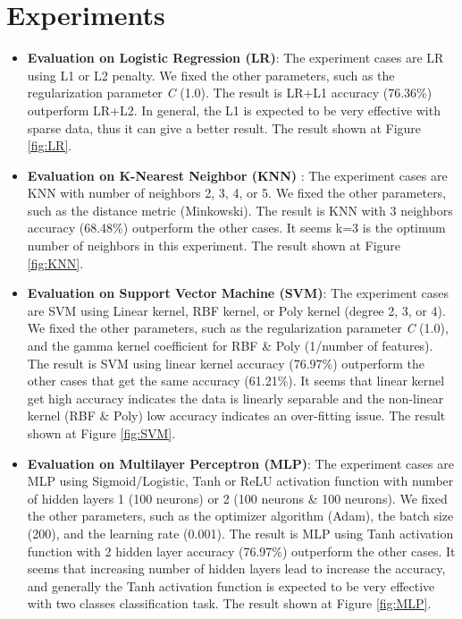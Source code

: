 \documentclass[a4paper,oneside]{article}
\begin{document}
\section{Experiments}
\begin{itemize}
\item \textbf{Evaluation on Logistic Regression (LR)}: The experiment cases are LR using L1 or L2 penalty. We fixed the other parameters, such as the regularization parameter \textit{C} (1.0). The result is LR+L1 accuracy (76.36\%) outperform LR+L2. In general, the L1 is expected to be very effective with sparse data, thus it can give a better result. The result shown at Figure \ref{fig:LR}.

\item \textbf{Evaluation on K-Nearest Neighbor (KNN)} : The experiment cases are KNN with number of neighbors 2, 3, 4, or 5. We fixed the other parameters, such as the distance metric (Minkowski). The result is KNN with 3 neighbors accuracy (68.48\%) outperform the other cases. It seems k=3 is the optimum number of neighbors in this experiment. The result shown at Figure \ref{fig:KNN}.

\item \textbf{Evaluation on Support Vector Machine (SVM)}: The experiment cases are SVM using Linear kernel, RBF kernel, or Poly kernel (degree 2, 3, or 4). We fixed the other parameters, such as the regularization parameter \textit{C} (1.0), and the gamma kernel coefficient for RBF \& Poly (1/number of features). The result is SVM using linear kernel accuracy (76.97\%) outperform the other cases that get the same accuracy (61.21\%). It seems that linear kernel get high accuracy indicates the data is linearly separable and the non-linear kernel (RBF \& Poly) low accuracy indicates an over-fitting issue. The result shown at Figure \ref{fig:SVM}.

\item \textbf{Evaluation on Multilayer Perceptron (MLP)}: The experiment cases are MLP using Sigmoid/Logistic, Tanh or ReLU activation function with number of hidden layers 1 (100 neurons) or 2 (100 neurons \& 100 neurons). We fixed the other parameters, such as the optimizer algorithm (Adam), the batch size (200), and the learning rate (0.001). The result is MLP using Tanh activation function with 2 hidden layer accuracy (76.97\%) outperform the other cases. It seems that increasing number of hidden layers lead to increase the accuracy, and generally the Tanh activation function is expected to be very effective with two classes classification task. The result shown at Figure \ref{fig:MLP}.

\end{itemize}
\end{document}
